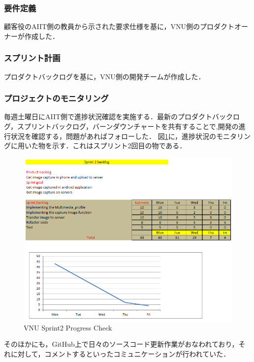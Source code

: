 \documentclass[a4j, 12Q, twocolumn, twoside]{jsarticle}
\begin{document}
\subsubsection{要件定義}
顧客役のAIIT側の教員から示された要求仕様を基に，VNU側のプロダクトオーナーが作成した．

\subsubsection{スプリント計画}
プロダクトバックログを基に，VNU側の開発チームが作成した．
\subsubsection{プロジェクトのモニタリング}


毎週土曜日にAIIT側で進捗状況確認を実施する．最新のプロダクトバックログ，スプリントバックログ，バーンダウンチャートを共有することで,開発の進行状況を確認する，問題があればフォローした．
図\ref{fig:progresscheck}に，進捗状況のモニタリングに用いた物を示す．これはスプリント2回目の物である．

\begin{figure}[htb]
  \begin{center}
    \includegraphics[width=\columnwidth]{./figures/Progress.png}
    \caption{VNU Sprint2 Progress Check}
    \label{fig:progresscheck}
  \end{center}
\end{figure}

そのほかにも，GitHub上で日々のソースコード更新作業がおなわれており，それに対して，コメントするといったコミュニケーションが行われていた．
\end{document}
